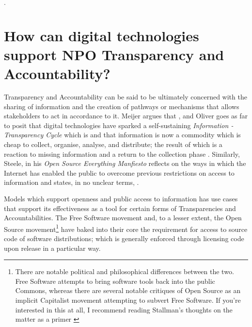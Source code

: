 %
.
%
%
\section{How can digital technologies support NPO Transparency and Accountability?}


Transparency and Accountability can be said to be ultimately concerned with the sharing of information and the creation of pathways or mechanisms that allows stakeholders to act in accordance to it. Meijer argues that  \cite{meijer_understanding_2009}, and Oliver goes as far to posit that digital technologies have sparked a self-sustaining \textit{Information - Transparency Cycle} which is  and that information is now a commodity which is cheap to collect, organise, analyse, and distribute; the result of which is a reaction to missing information and a return to the collection phase \cite{oliver_what_2004}. Similarly, Steele, in his \textit{Open Source Everything Manfiesto} reflects on the ways in which the Internet has enabled the public to overcome previous restrictions on access to information and states, in no unclear terms,  \cite{steele_open-source_2012}.

Models which support openness and public access to information has use cases that support its effectiveness as a tool for certain forms of Transparencies and Accountabilities. The Free Software movement and, to a lesser extent, the Open Source movement\footnote{There are notable political and philosophical differences between the two. Free Software attempts to bring software tools back into the public Commons, whereas there are several notable critiques of Open Source as an implicit Capitalist movement attempting to subvert Free Software. If you're interested in this at all, I recommend reading Stallman's thoughts on the matter as a primer \cite{stallman_why_2002, stallman_why_2016}} have baked into their core the requirement for access to source code of software distributions; which is generally enforced through licensing code upon release in a particular way.


